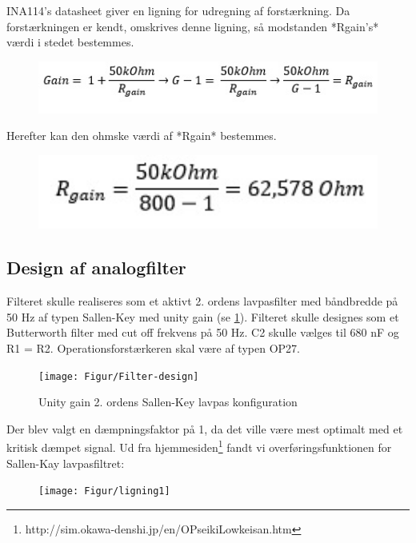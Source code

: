 INA114’s datasheet giver en ligning for udregning af forstærkning. Da forstærkningen er kendt, omskrives denne ligning, så modstanden *Rgain’s* værdi i stedet bestemmes.\\

\begin{figure}[h]
	\centering
	\includegraphics[width=1\textwidth]{Figurer/omskrivningtilgain}
\end{figure}

Herefter kan den ohmske værdi af *Rgain* bestemmes.\\

\begin{figure}[h]
	\centering
	\includegraphics[width=1\textwidth]{Figurer/udregningafgain}
\end{figure}

\subsection{Design af analogfilter}
Filteret skulle realiseres som et aktivt 2. ordens lavpasfilter med båndbredde på 50 Hz af typen Sallen-Key med unity gain (se \ref{fig:Filter}). Filteret skulle designes som et Butterworth filter med cut off frekvens på 50 Hz. C2 skulle vælges til 680 nF og R1 = R2. Operationsforstærkeren skal være af typen OP27.  

\begin{figure}[h]
	\centering
	\texttt{[image: Figur/Filter-design]}
	\caption{Unity gain 2. ordens Sallen-Key lavpas konfiguration}
	\label{fig:Filter}
\end{figure}

Der blev valgt en dæmpningsfaktor på 1, da det ville være mest optimalt med et kritisk dæmpet signal. Ud fra hjemmesiden\footnote{http://sim.okawa-denshi.jp/en/OPseikiLowkeisan.htm} fandt vi overføringsfunktionen for Sallen-Kay lavpasfiltret:

\begin{figure}[h]
	\centering
	\texttt{[image: Figur/ligning1]}
	\label{fig:lign1}
\end{figure}

